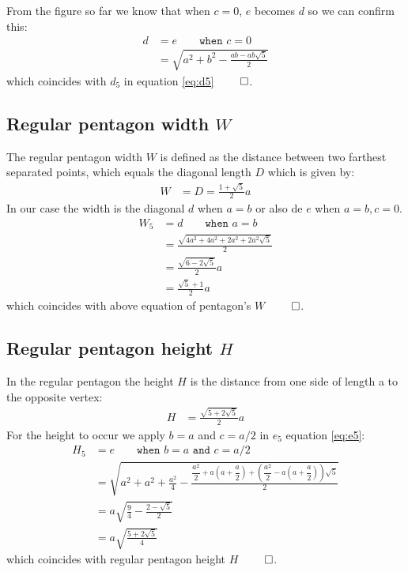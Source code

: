 \documentclass[11pt]{article}
\begin{document}
From the figure so far we know that when $c=0$, $e$ becomes $d$ so we can confirm this:
\begin{align}
d &= e \qquad \texttt{when } c=0 \nonumber\\
 &= \sqrt{a^2 + b^2 - \frac{ ab - ab\sqrt5}2}
\end{align}
which coincides with $d_5$ in equation \ref{eq:d5} $\qed$.

\subsection{Regular pentagon width $W$}

The regular pentagon width $W$ is defined as the 
distance between two farthest separated points, which equals the diagonal length $D$
which is given by:
\begin{align}
W &= D = \frac{1+\sqrt5}{2}a
\end{align}
In our case the width is the diagonal $d$ when $a=b$ or also de $e$ when $a=b,c=0$.
\begin{align}
W_5 &= d \qquad \texttt{when } a=b\nonumber\\
 &= \frac{\sqrt{4a^2 + 4a^2 + 2a^2 + 2a^2\sqrt5}}2\nonumber\\
 &= \frac{\sqrt{6-2\sqrt5}}{2}a\nonumber\\
 &= \frac{\sqrt5+1}{2}a
\end{align}
which coincides with above equation of pentagon's $W$ $\qed$.

\subsection{Regular pentagon height $H$}

In the regular pentagon the height $H$ is the distance from one side of length a to the opposite vertex:
\begin{align}
H &= \frac{\sqrt{5+2\sqrt{5}}}{2}a
\end{align}
For the height to occur we apply $b = a$ and $c = a/2$ in $e_5$ equation \ref{eq:e5}:
\begin{align}
H_5 &= e \qquad \texttt{when } b=a \texttt{ and } c=a/2 \nonumber\\
 &= \sqrt{a^2 + a^2 + \frac{a^2}4
 - \frac{\dfrac{a^2}2 + a\left(a+\dfrac{a}2\right) 
 + \left(\dfrac{a^2}2 - a\left(a+\dfrac{a}2\right)\right)\sqrt5}2} \nonumber\\
 &= a\sqrt{\frac{9}4 - \frac{2 - \sqrt5}{2}} \nonumber\\
 &= a\sqrt{\frac{5+2\sqrt5}{4}}
\end{align}
which coincides with regular pentagon height $H$ $\qed$.
\end{document}
